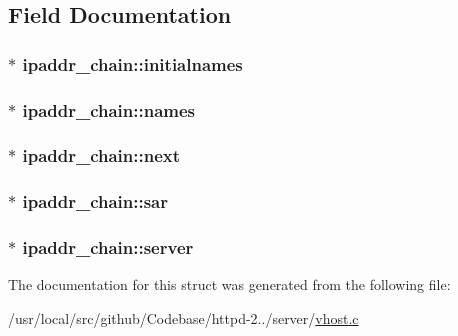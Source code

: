 \subsection{Field Documentation}
\subsubsection[{\texorpdfstring{initialnames}{initialnames}}]{$\ast$ ipaddr\+\_\+chain\+::initialnames}\hypertarget{structipaddr__chain_a9d8fbaa4ecaa13cbf53d5d03f01e19b4}{}\label{structipaddr__chain_a9d8fbaa4ecaa13cbf53d5d03f01e19b4}
\subsubsection[{\texorpdfstring{names}{names}}]{$\ast$ ipaddr\+\_\+chain\+::names}\hypertarget{structipaddr__chain_ad9390274138baf9a904e07690b8370a2}{}\label{structipaddr__chain_ad9390274138baf9a904e07690b8370a2}
\subsubsection[{\texorpdfstring{next}{next}}]{$\ast$ ipaddr\+\_\+chain\+::next}\hypertarget{structipaddr__chain_ab97edaa652fcb5e0e3bfa448e1999638}{}\label{structipaddr__chain_ab97edaa652fcb5e0e3bfa448e1999638}
\subsubsection[{\texorpdfstring{sar}{sar}}]{$\ast$ ipaddr\+\_\+chain\+::sar}\hypertarget{structipaddr__chain_a6ac2cc1263061eececba28f436dd2bd6}{}\label{structipaddr__chain_a6ac2cc1263061eececba28f436dd2bd6}
\subsubsection[{\texorpdfstring{server}{server}}]{$\ast$ ipaddr\+\_\+chain\+::server}\hypertarget{structipaddr__chain_a67120925940112a50cd3c5d3d558357f}{}\label{structipaddr__chain_a67120925940112a50cd3c5d3d558357f}


The documentation for this struct was generated from the following file\+:\begin{DoxyCompactItemize}
\item 
/usr/local/src/github/\+Codebase/httpd-\/2../server/\hyperlink{vhost_8c}{vhost.\+c}\end{DoxyCompactItemize}
